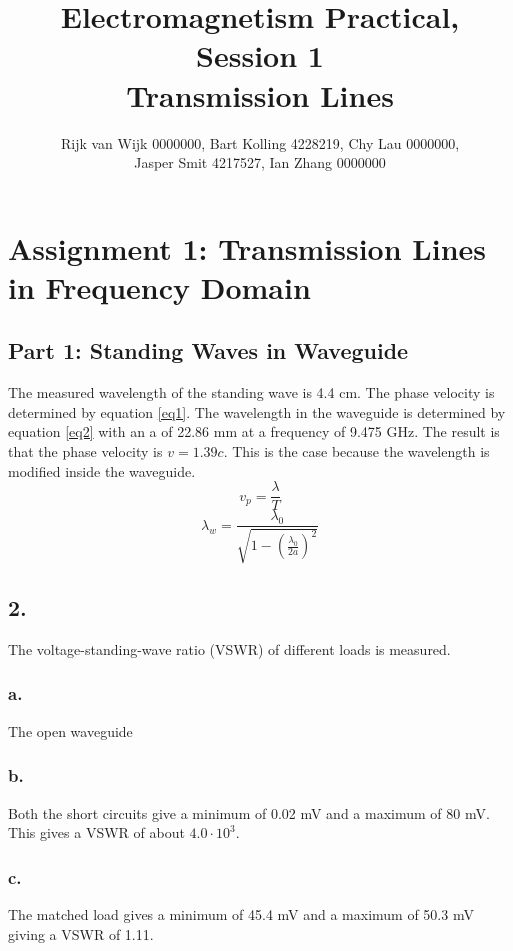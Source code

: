 \documentclass{article}
\title{Electromagnetism Practical, Session 1\\Transmission Lines}
\author{Rijk van Wijk 0000000, Bart Kolling 4228219, Chy Lau 0000000,\\ Jasper Smit 4217527, Ian Zhang 0000000}
\begin{document}
	\maketitle
	\section*{Assignment 1: Transmission Lines in Frequency Domain}
	\subsection*{Part 1: Standing Waves in Waveguide}
	The measured wavelength of the standing wave is 4.4 cm. The phase velocity is determined by equation \ref{eq1}. The wavelength in the waveguide is determined by equation \ref{eq2} with an a of 22.86 mm at a frequency of 9.475 GHz. The result is that the phase velocity is $v = 1.39c$. This is the case because the wavelength is modified inside the waveguide.
	\begin{equation}
	\label{eq1}
	v_p = \frac{\lambda}{T}
	\end{equation}
	\begin{equation}
	\label{eq2}
	\lambda _w = \frac{\lambda _0}{\sqrt{1 - (\frac{\lambda _0}{2a})^2}}
	\end{equation}
	
	\subsection*{2.}
	The voltage-standing-wave ratio (VSWR) of different loads is measured.
	\subsubsection*{a.}
The open waveguide 
	
	\subsubsection*{b.}
	Both the short circuits give a minimum of 0.02 mV and a maximum of 80 mV. This gives a VSWR of about $4.0 \cdot 10^3$.
	
	\subsubsection*{c.}
	The matched load gives a minimum of 45.4 mV and a maximum of 50.3 mV giving a VSWR of 1.11.
	
\end{document}
